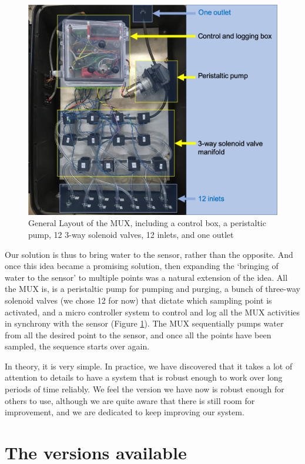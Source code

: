 \documentclass[]{book}
\begin{document}
\begin{figure}

{\centering \includegraphics[width=0.8\linewidth]{pictures/MUXLayout} 

}

\caption{General Layout of the MUX, including a control box, a peristaltic pump, 12 3-way solenoid valves, 12 inlets, and one outlet}\label{fig:MUXLayout}
\end{figure}

Our solution is thus to bring water to the sensor, rather than the opposite. And once this idea became a promising solution, then expanding the `bringing of water to the sensor' to multiple points was a natural extension of the idea. All the MUX is, is a peristaltic pump for pumping and purging, a bunch of three-way solenoid valves (we chose 12 for now) that dictate which sampling point is activated, and a micro controller system to control and log all the MUX activities in synchrony with the sensor (Figure \ref{fig:MUXLayout}). The MUX sequentially pumps water from all the desired point to the sensor, and once all the points have been sampled, the sequence starts over again.

In theory, it is very simple. In practice, we have discovered that it takes a lot of attention to details to have a system that is robust enough to work over long periods of time reliably. We feel the version we have now is robust enough for others to use, although we are quite aware that there is still room for improvement, and we are dedicated to keep improving our system.

\hypertarget{the-versions-available}{%
\section{The versions available}\label{the-versions-available}}
\end{document}
